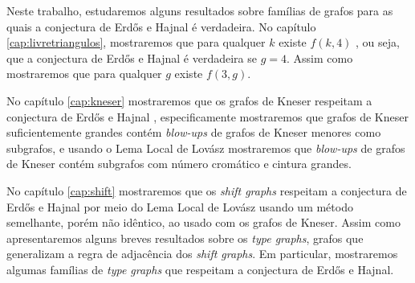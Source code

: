 Neste trabalho, estudaremos alguns resultados sobre famílias de grafos para as quais a conjectura de Erd\H{o}s e Hajnal é verdadeira. No capítulo \ref{cap:livretriangulos}, mostraremos que para qualquer $k$ existe $f(k,4)$ \cite{rodl1977chromatic}, ou seja, que a conjectura de Erd\H{o}s e Hajnal é verdadeira se $g=4$. Assim como mostraremos que para qualquer $g$ existe $f(3,g)$.

No capítulo \ref{cap:kneser} mostraremos que os grafos de Kneser respeitam a conjectura de Erd\H{o}s e Hajnal \cite{mohar2015triangle}, especificamente mostraremos que grafos de Kneser suficientemente grandes contém \textit{blow-ups} de grafos de Kneser menores como subgrafos, e usando o Lema Local de Lovász mostraremos que \textit{blow-ups} de grafos de Kneser contém subgrafos com número cromático e cintura grandes.

No capítulo \ref{cap:shift} mostraremos que os \textit{shift graphs} respeitam a conjectura de Erd\H{o}s e Hajnal \cite{gabor2018cepa} por meio do Lema Local de Lovász usando um método semelhante, porém não idêntico, ao usado com os grafos de Kneser. Assim como apresentaremos alguns breves resultados sobre os \textit{type graphs}, grafos que generalizam a regra de adjacência dos \textit{shift graphs}. Em particular, mostraremos algumas famílias de \textit{type graphs} que respeitam a conjectura de Erd\H{o}s e Hajnal.